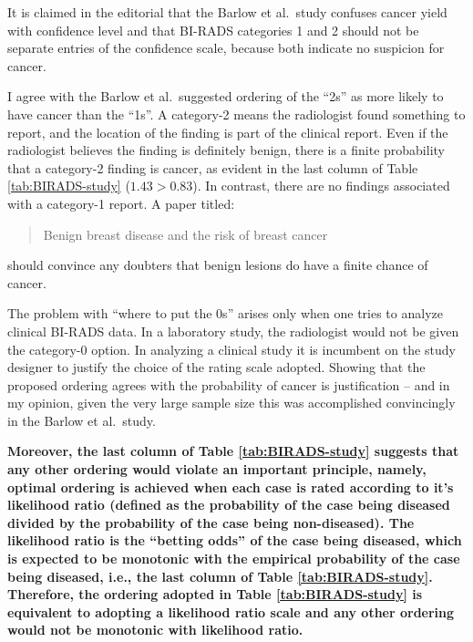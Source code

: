 \documentclass[
]{book}
\begin{document}
It is claimed in the editorial that the Barlow et al.~study confuses cancer yield with confidence level and that BI-RADS categories 1 and 2 should not be separate entries of the confidence scale, because both indicate no suspicion for cancer.

I agree with the Barlow et al.~suggested ordering of the ``2s'' as more likely to have cancer than the ``1s''. A category-2 means the radiologist found something to report, and the location of the finding is part of the clinical report. Even if the radiologist believes the finding is definitely benign, there is a finite probability that a category-2 finding is cancer, as evident in the last column of Table \ref{tab:BIRADS-study} (\(1.43 > 0.83\)). In contrast, there are no findings associated with a category-1 report. A paper \citep{hartmann2005benign} titled:

\begin{quote}
Benign breast disease and the risk of breast cancer
\end{quote}

should convince any doubters that benign lesions do have a finite chance of cancer.

The problem with ``where to put the 0s'' arises only when one tries to analyze clinical BI-RADS data. In a laboratory study, the radiologist would not be given the category-0 option. In analyzing a clinical study it is incumbent on the study designer to justify the choice of the rating scale adopted. Showing that the proposed ordering agrees with the probability of cancer is justification -- and in my opinion, given the very large sample size this was accomplished convincingly in the Barlow et al.~study.

\textbf{Moreover, the last column of Table \ref{tab:BIRADS-study} suggests that any other ordering would violate an important principle, namely, optimal ordering is achieved when each case is rated according to it's likelihood ratio (defined as the probability of the case being diseased divided by the probability of the case being non-diseased). The likelihood ratio is the ``betting odds'' of the case being diseased, which is expected to be monotonic with the empirical probability of the case being diseased, i.e., the last column of Table \ref{tab:BIRADS-study}. Therefore, the ordering adopted in Table \ref{tab:BIRADS-study} is equivalent to adopting a likelihood ratio scale and any other ordering would not be monotonic with likelihood ratio.}
\end{document}
